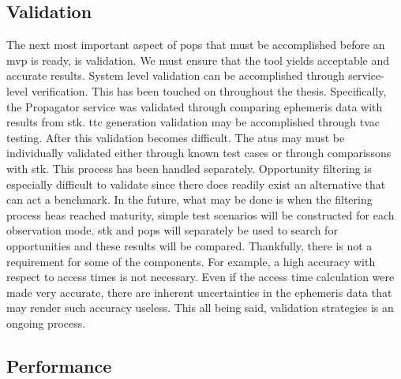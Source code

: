 \subsection{Validation}

The next most important aspect of \gls{pops} that must be accomplished before
an \gls{mvp} is ready, is validation. We must ensure that the tool yields
acceptable and accurate results. System level validation can be accomplished
through service-level verification. This has been touched on throughout the
thesis. Specifically, the Propagator service was validated through comparing
ephemeris data with results from \gls{stk}. \gls{ttc} generation validation may
be accomplished through \gls{tvac} testing. After this validation becomes
difficult. The \glspl{atu} may must be individually validated either through
known test cases or through comparissons with \gls{stk}. This process has been
handled separately. Opportunity filtering is especially difficult to validate
since there does readily exist an alternative that can act a benchmark. In the
future, what may be done is when the filtering process heas reached maturity,
simple test scenarios will be constructed for each observation mode. \gls{stk}
and \gls{pops} will separately be used to search for opportunities and these
results will be compared. Thankfully, there is not a requirement for some of
the components. For example, a high accuracy with respect to access times is
not necessary. Even if the access time calculation were made very accurate,
there are inherent uncertainties in the ephemeris data that may render such
accuracy useless. This all being said, validation strategies is an ongoing
process.
 
%

\subsection{Performance}


